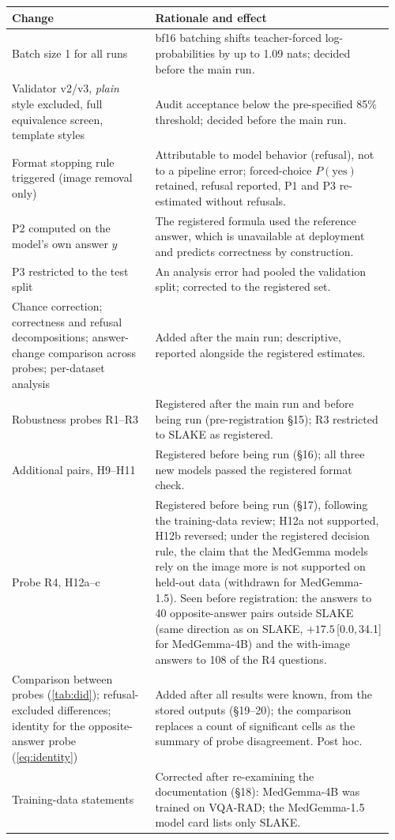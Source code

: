 \documentclass[10pt,twocolumn,letterpaper]{article}
\newcommand{\ci}[2]{\,[#1,\,#2]}  %
\begin{document}
\smallskip\noindent\small
\begin{tabular}{@{}p{0.36\linewidth}p{0.6\linewidth}@{}}
\toprule
Change & Rationale and effect\\
\midrule
Batch size 1 for all runs & bf16 batching shifts teacher-forced log-probabilities by up to 1.09 nats; decided before the main run.\\
Validator v2/v3, \emph{plain} style excluded, full equivalence screen, template styles & Audit acceptance below the pre-specified 85\% threshold; decided before the main run.\\
Format stopping rule triggered (image removal only) & Attributable to model behavior (refusal), not to a pipeline error; forced-choice $P(\text{yes})$ retained, refusal reported, P1 and P3 re-estimated without refusals.\\
P2 computed on the model's own answer $\hat y$ & The registered formula used the reference answer, which is unavailable at deployment and predicts correctness by construction.\\
P3 restricted to the test split & An analysis error had pooled the validation split; corrected to the registered set.\\
Chance correction; correctness and refusal decompositions; answer-change comparison across probes; per-dataset analysis & Added after the main run; descriptive, reported alongside the registered estimates.\\
Robustness probes R1--R3 & Registered after the main run and before being run (pre-registration \S15); R3 restricted to SLAKE as registered.\\
Additional pairs, H9--H11 & Registered before being run (\S16); all three new models passed the registered format check.\\
Probe R4, H12a--c & Registered before being run (\S17), following the training-data review; H12a not supported, H12b reversed; under the registered decision rule, the claim that the MedGemma models rely on the image more is not supported on held-out data (withdrawn for MedGemma-1.5). Seen before registration: the answers to 40 opposite-answer pairs outside SLAKE (same direction as on SLAKE, $+17.5$\ci{0.0}{34.1} for MedGemma-4B) and the with-image answers to 108 of the R4 questions.\\
Comparison between probes (\cref{tab:did}); refusal-excluded differences; identity for the opposite-answer probe (\cref{eq:identity}) & Added after all results were known, from the stored outputs (\S19--20); the comparison replaces a count of significant cells as the summary of probe disagreement. Post hoc.\\
Training-data statements & Corrected after re-examining the documentation (\S18): MedGemma-4B was trained on VQA-RAD; the MedGemma-1.5 model card lists only SLAKE.\\
\bottomrule
\end{tabular}
\normalsize
\end{document}

